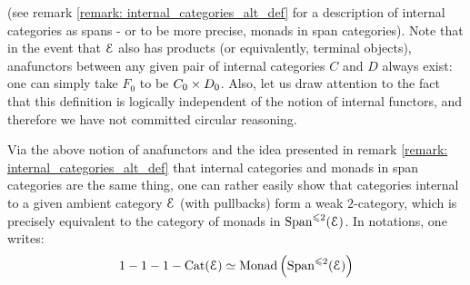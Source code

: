 \begin{definition}
\begin{enumerate}
$$                                    $$
                                (see remark \ref{remark: internal_categories_alt_def} for a description of internal categories as spans - or to be more precise, monads in span categories). Note that in the event that $\mathcal{E}$ also has products (or equivalently, terminal objects), anafunctors between any given pair of internal categories $C$ and $D$ always exist: one can simply take $F_0$ to be $C_0 \x D_0$. Also, let us draw attention to the fact that this definition is logically independent of the notion of internal functors, and therefore we have not committed circular reasoning.
                            \end{enumerate}
                    \end{definition}
                    \begin{remark} \label{remark: categories_of_internal_categories}
                        Via the above notion of anafunctors and the idea presented in remark \ref{remark: internal_categories_alt_def} that internal categories and monads in span categories are the same thing, one can rather easily show that categories internal to a given ambient category $\mathcal{E}$ (with pullbacks) form a weak $2$-category, which is precisely equivalent to the category of monads in $\mathrm{Span}^{\leqslant 2}(\mathcal{E})$. In notations, one writes:
                            $$1-1-1-\mathrm{Cat}(\mathcal{E}) \simeq \mathrm{Monad}\left(\mathrm{Span}^{\leqslant 2}(\mathcal{E})\right)$$
                    \end{remark}
